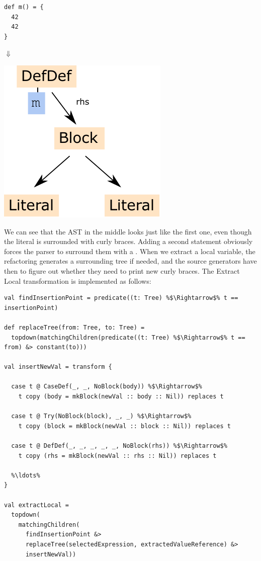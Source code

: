 \documentclass[10pt,a4paper,oneside]{scrreprt}
\begin{document}
\begin{multicols}{3}
\columnbreak

\begin{lstlisting}
def m() = { 
  42
  42
}
\end{lstlisting}

\begin{center}
  $\Downarrow$
\end{center}
\includegraphics[width=0.9\linewidth]{defdef_with_block.pdf}
\end{multicols}

We can see that the AST in the middle looks just like the first one, even though the literal is surrounded with curly braces. Adding a second statement obviously forces the parser to surround them with a . When we extract a local variable, the refactoring generates a surrounding  tree if needed, and the source generators have then to figure out whether they need to print new curly braces.
\newpage
The Extract Local transformation is implemented as follows:

\begin{lstlisting}
val findInsertionPoint = predicate((t: Tree) %$\Rightarrow$% t == insertionPoint)

def replaceTree(from: Tree, to: Tree) = 
  topdown(matchingChildren(predicate((t: Tree) %$\Rightarrow$% t == from) &> constant(to)))

val insertNewVal = transform {

  case t @ CaseDef(_, _, NoBlock(body)) %$\Rightarrow$%
    t copy (body = mkBlock(newVal :: body :: Nil)) replaces t
    
  case t @ Try(NoBlock(block), _, _) %$\Rightarrow$%
    t copy (block = mkBlock(newVal :: block :: Nil)) replaces t
    
  case t @ DefDef(_, _, _, _, _, NoBlock(rhs)) %$\Rightarrow$%
    t copy (rhs = mkBlock(newVal :: rhs :: Nil)) replaces t
    
  %\ldots%
}

val extractLocal = 
  topdown(
    matchingChildren(
      findInsertionPoint &> 
      replaceTree(selectedExpression, extractedValueReference) &>
      insertNewVal))
\end{lstlisting}
\end{document}
